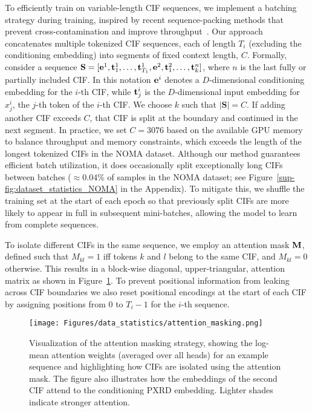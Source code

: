 To efficiently train on variable-length CIF sequences, we implement a batching strategy during training, inspired by recent sequence-packing methods that prevent cross-contamination and improve throughput~\cite{KosecFuKrell}. Our approach concatenates multiple tokenized CIF sequences, each of length $T_i$ (excluding the conditioning embedding) into segments of fixed context length, $C$. Formally, consider a sequence $\mathbf{S} = [\mathbf{e}^{1}, {\mathbf t}^{1}_1, \dots, {\mathbf t}^{1}_{T_1}, \mathbf{e}^{2}, {\mathbf t}^{2}_1, \dots, {\mathbf t}^{n}_k]$, where $n$ is the last fully or partially included CIF. In this notation ${\mathbf e}^{i}$ denotes a $D$-dimensional conditioning embedding for the $i$-th CIF, while ${\mathbf t}_j^i$ is the $D$-dimensional input embedding for $x_j^i$, the $j$-th token of the $i$-th CIF. We choose $k$ such that $|\mathbf{S}| = C$. If adding another CIF exceeds $C$, that CIF is split at the boundary and continued in the next segment. In practice, we set $C=3076$ based on the available GPU memory to balance throughput and memory constraints, which exceeds the length of the longest tokenized CIFs in the NOMA dataset. Although our method guarantees efficient batch utilization, it does occasionally split exceptionally long CIFs between batches ($\approx\!0.04$\% of samples in the NOMA dataset; see Figure~\ref{sup-fig:dataset_statistics_NOMA} in the Appendix). To mitigate this, we shuffle the training set at the start of each epoch so that previously split CIFs are more likely to appear in full in subsequent mini-batches, allowing the model to learn from complete sequences.

To isolate different CIFs in the same sequence, we employ an attention mask ${\mathbf M}$, defined such that $M_{kl} = 1$ iff tokens $k$ and $l$ belong to the same CIF, and $M_{kl} = 0$ otherwise. This results in a block-wise diagonal, upper-triangular, attention matrix as shown in Figure~\ref{fig:attn_masking}. To prevent positional information from leaking across CIF boundaries we also reset positional encodings at the start of each CIF by assigning positions from $0$ to $T_{i}-1$ for the $i$-th sequence. 

\begin{figure}[t]
\begin{center}
\centerline{\texttt{[image: Figures/data\_statistics/attention\_masking.png]}}
\caption{Visualization of the attention masking strategy, showing the log-mean attention weights (averaged over all heads) for an example sequence and highlighting how CIFs are isolated using the attention mask. The figure also illustrates how the embeddings of the second CIF attend to the conditioning PXRD embedding. Lighter shades indicate stronger attention.
} \label{fig:attn_masking}
\end{center}
\vskip -0.2in
\end{figure}

